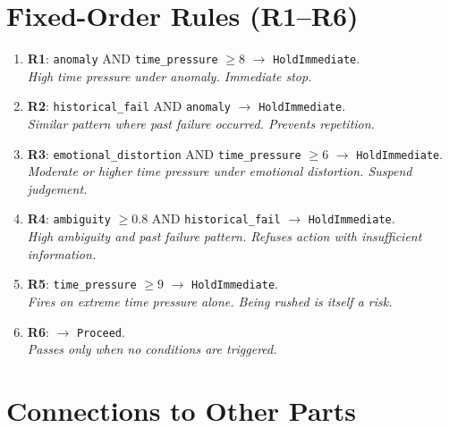 \section{Fixed-Order Rules (R1--R6)}
\label{sec:reflex-rules}

\begin{enumerate}
\item \textbf{R1}: \texttt{anomaly} AND
\texttt{time\_pressure} $\ge 8$ $\to$ \texttt{HoldImmediate}.\\
\textit{High time pressure under anomaly. Immediate stop.}

\item \textbf{R2}: \texttt{historical\_fail} AND
\texttt{anomaly} $\to$ \texttt{HoldImmediate}.\\
\textit{Similar pattern where past failure occurred. Prevents
repetition.}

\item \textbf{R3}: \texttt{emotional\_distortion} AND
\texttt{time\_pressure} $\ge 6$ $\to$ \texttt{HoldImmediate}.\\
\textit{Moderate or higher time pressure under emotional distortion.
Suspend judgement.}

\item \textbf{R4}: \texttt{ambiguity} $\ge 0.8$ AND
\texttt{historical\_fail} $\to$ \texttt{HoldImmediate}.\\
\textit{High ambiguity and past failure pattern. Refuses action with
insufficient information.}

\item \textbf{R5}: \texttt{time\_pressure} $\ge 9$ $\to$
\texttt{HoldImmediate}.\\
\textit{Fires on extreme time pressure alone. Being rushed is itself
a risk.}

\item \textbf{R6}: $\to$ \texttt{Proceed}.\\
\textit{Passes only when no conditions are triggered.}
\end{enumerate}


\section*{Connections to Other Parts}

